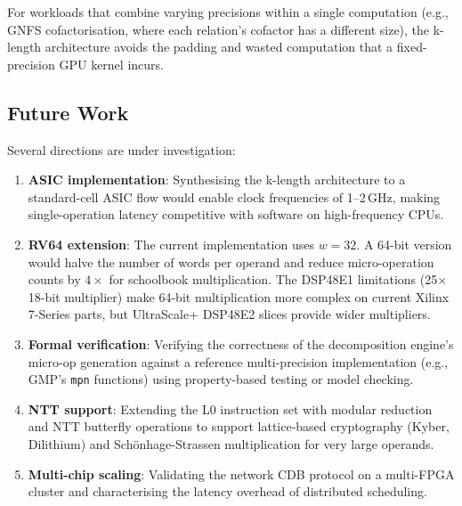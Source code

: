\documentclass[11pt,a4paper]{article}
\begin{document}
For workloads that combine varying precisions within a single computation
(e.g., GNFS cofactorisation, where each relation's cofactor has a different
size), the k-length architecture avoids the padding and wasted computation
that a fixed-precision GPU kernel incurs.

\subsection{Future Work}
\label{sec:future-work}

Several directions are under investigation:

\begin{enumerate}[leftmargin=*]
  \item \textbf{ASIC implementation}: Synthesising the k-length architecture
    to a standard-cell ASIC flow would enable clock frequencies of 1--2\,GHz,
    making single-operation latency competitive with software on high-frequency
    CPUs.

  \item \textbf{RV64 extension}: The current implementation uses $w = 32$.
    A 64-bit version would halve the number of words per operand and reduce
    micro-operation counts by $4\times$ for schoolbook multiplication.
    The DSP48E1 limitations (25$\times$18-bit multiplier) make 64-bit
    multiplication more complex on current Xilinx 7-Series parts, but
    UltraScale+ DSP48E2 slices provide wider multipliers.

  \item \textbf{Formal verification}: Verifying the correctness of the
    decomposition engine's micro-op generation against a reference
    multi-precision implementation (e.g., GMP's \texttt{mpn} functions)
    using property-based testing or model checking.

  \item \textbf{NTT support}: Extending the L0 instruction set with
    modular reduction and NTT butterfly operations to support lattice-based
    cryptography (Kyber, Dilithium) and Sch\"{o}nhage-Strassen multiplication
    for very large operands.

  \item \textbf{Multi-chip scaling}: Validating the network CDB protocol
    on a multi-FPGA cluster and characterising the latency overhead of
    distributed scheduling.
\end{enumerate}
\end{document}
